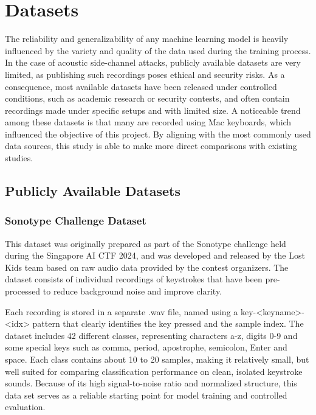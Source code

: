 \documentclass[a4paper,11pt,twoside]{report}
\theoremstyle{definition}
\begin{document}
\chapter{Datasets}
The reliability and generalizability of any machine learning model is heavily influenced by the variety and quality of the data used during the training process. In the case of acoustic side-channel attacks, publicly available datasets are very limited, as publishing such recordings poses ethical and security risks. As a consequence, most available datasets have been released under controlled conditions, such as academic research or security contests, and often contain recordings made under specific setups and with limited size. A noticeable trend among these datasets is that many are recorded using Mac keyboards, which influenced the objective of this project. By aligning with the most commonly used data sources, this study is able to make more direct comparisons with existing studies.


\section{Publicly Available Datasets}
\label{publicDatasets}

\subsection{Sonotype Challenge Dataset \protect\footnotemark}
\label{kaggleDataset}



This dataset was originally prepared as part of the Sonotype challenge held during the Singapore AI CTF 2024, and was developed and released by the Lost Kids team based on raw audio data provided by the contest organizers. The dataset consists of individual recordings of keystrokes that have been pre-processed to reduce background noise and improve clarity.

Each recording is stored in a separate .wav file, named using a key-<keyname>-<idx> pattern that clearly identifies the key pressed and the sample index. The dataset includes 42 different classes, representing characters a-z, digits 0-9 and some special keys such as comma, period, apostrophe, semicolon, Enter and space. Each class contains about 10 to 20 samples, making it relatively small, but well suited for comparing classification performance on clean, isolated keystroke sounds. Because of its high signal-to-noise ratio and normalized structure, this data set serves as a reliable starting point for model training and controlled evaluation.
\end{document}
